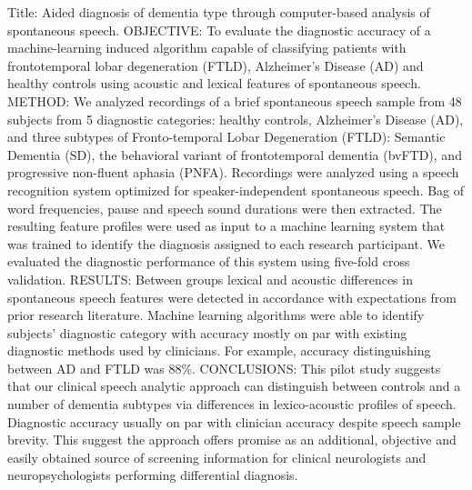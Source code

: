 Title: Aided diagnosis of dementia type through computer-based analysis of spontaneous speech. OBJECTIVE: To evaluate the diagnostic accuracy of a machine-learning induced algorithm capable of classifying patients with frontotemporal lobar degeneration (FTLD), Alzheimer's Disease (AD) and healthy controls using acoustic and lexical features of spontaneous speech. METHOD: We analyzed recordings of a brief spontaneous speech sample from 48 subjects from 5 diagnostic categories: healthy controls, Alzheimer's Disease (AD), and three subtypes of Fronto-temporal Lobar Degeneration (FTLD): Semantic Dementia (SD), the behavioral variant of frontotemporal dementia (bvFTD), and progressive non-fluent aphasia (PNFA). Recordings were analyzed using a speech recognition system optimized for speaker-independent spontaneous speech.  Bag of word frequencies, pause and speech sound durations were then extracted.  The resulting feature profiles were used as input to a machine learning system that was trained to identify the diagnosis assigned to each research participant. We evaluated the diagnostic performance of this system using five-fold cross validation. RESULTS: Between groups lexical and acoustic differences in spontaneous speech features were detected in accordance with expectations from prior research literature. Machine learning algorithms were able to identify subjects' diagnostic category with accuracy mostly on par with existing diagnostic methods used by clinicians. For example, accuracy distinguishing between AD and FTLD was 88\%. CONCLUSIONS: This pilot study suggests that our clinical speech analytic approach can distinguish between controls and a number of dementia subtypes via differences in lexico-acoustic profiles of speech. Diagnostic accuracy usually on par with clinician accuracy                          despite speech sample brevity. This suggest the approach offers promise as an additional, objective and easily obtained source of screening information for clinical neurologists and neuropsychologists performing differential diagnosis.
